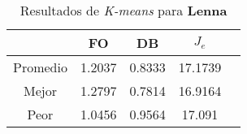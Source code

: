\begin{table}[h!]
\footnotesize
\begin{center}
\begin{tabular}{|c|c|c|c|c|}
\hline
&{\bf FO}&{\bf DB}&{\bf $J_e$}\\
\hline
\hline
Promedio & 1.2037 & 0.8333 & 17.1739\\
\hline
Mejor & 1.2797 & 0.7814 & 16.9164\\
\hline
Peor & 1.0456 & 0.9564 & 17.091\\
\hline
\end{tabular}
\caption{Resultados de \emph{K-means} para {\bf Lenna}}
\label{tb:pmpkmeansimg}
\end{center}
\end{table}
